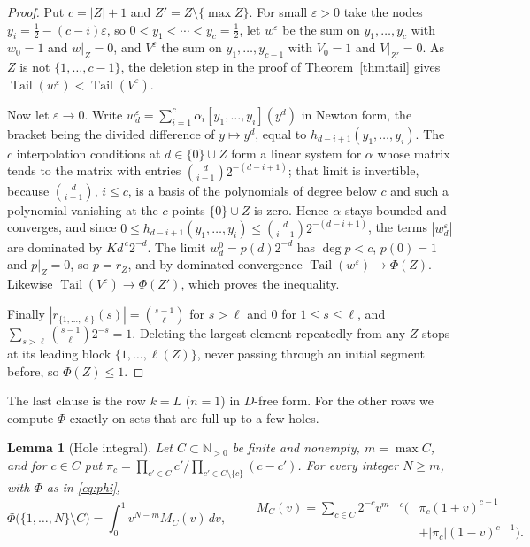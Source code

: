 \documentclass[11pt]{article}
\newtheorem{lemma}[theorem]{Lemma}
\newcommand{\N}{\mathbb N}
\DeclareMathOperator{\Tail}{Tail}
\begin{document}
\begin{proof}
Put $c=|Z|+1$ and $Z'=Z\setminus\{\max Z\}$.  For small $\varepsilon>0$ take
the nodes $y_i=\tfrac12-(c-i)\varepsilon$, so $0<y_1<\cdots<y_c=\tfrac12$,
let $w^\varepsilon$ be the sum on $y_1,\ldots,y_c$ with $w_0=1$ and
$w|_Z=0$, and $V^\varepsilon$ the sum on $y_1,\ldots,y_{c-1}$ with $V_0=1$
and $V|_{Z'}=0$.  As $Z$ is not $\{1,\ldots,c-1\}$, the deletion step in the
proof of Theorem~\ref{thm:tail} gives $\Tail(w^\varepsilon)<\Tail(V^\varepsilon)$.

Now let $\varepsilon\to0$.  Write $w^\varepsilon_d=\sum_{i=1}^c\alpha_i
[y_1,\ldots,y_i](y^d)$ in Newton form, the bracket being the divided
difference of $y\mapsto y^d$, equal to $h_{d-i+1}(y_1,\ldots,y_i)$.  The
$c$ interpolation conditions at $d\in\{0\}\cup Z$ form a linear system for
$\alpha$ whose matrix tends to the matrix with entries
$\binom d{i-1}2^{-(d-i+1)}$; that limit is invertible, because
$\binom d{i-1}$, $i\le c$, is a basis of the polynomials of degree below
$c$ and such a polynomial vanishing at the $c$ points $\{0\}\cup Z$ is zero.
Hence $\alpha$ stays bounded and converges, and since
$0\le h_{d-i+1}(y_1,\ldots,y_i)\le\binom d{i-1}2^{-(d-i+1)}$, the terms
$|w^\varepsilon_d|$ are dominated by $Kd^{\,c}2^{-d}$.  The limit
$w^0_d=p(d)2^{-d}$ has $\deg p<c$, $p(0)=1$ and $p|_Z=0$, so $p=r_Z$, and by
dominated convergence $\Tail(w^\varepsilon)\to\Phi(Z)$.  Likewise
$\Tail(V^\varepsilon)\to\Phi(Z')$, which proves the inequality.

Finally $|r_{\{1,\ldots,\ell\}}(s)|=\binom{s-1}\ell$ for $s>\ell$ and $0$ for
$1\le s\le\ell$, and $\sum_{s>\ell}\binom{s-1}\ell2^{-s}=1$.  Deleting the
largest element repeatedly from any $Z$ stops at its leading block
$\{1,\ldots,\ell(Z)\}$, never passing through an initial segment before, so
$\Phi(Z)\le1$.
\end{proof}

The last clause is the row $k=L$ ($n=1$) in $D$-free form.  For the other
rows we compute $\Phi$ exactly on sets that are full up to a few holes.

\begin{lemma}[Hole integral]\label{lem:holeint}
Let $C\subset\N_{>0}$ be finite and nonempty, $m=\max C$, and for
$c\in C$ put $\pi_c=\prod_{c'\in C}c'\big/\prod_{c'\in C\setminus\{c\}}(c-c')$.
For every integer $N\ge m$, with $\Phi$ as in \eqref{eq:phi},
\[
  \Phi\bigl(\{1,\ldots,N\}\setminus C\bigr)=\int_0^1v^{N-m}M_C(v)\,dv,
  \qquad
  \begin{aligned}
  M_C(v)=\sum_{c\in C}2^{-c}v^{m-c}\bigl(&\pi_c(1+v)^{c-1}\\
    &+|\pi_c|(1-v)^{c-1}\bigr).
  \end{aligned}
\]
\end{lemma}
\end{document}
